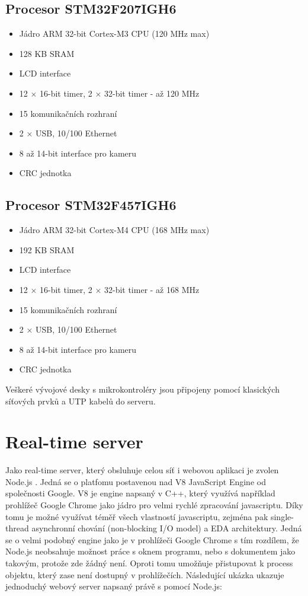 \subsection{Procesor STM32F207IGH6}
\begin{itemize}
\itemsep0em
\item Jádro ARM 32-bit Cortex\texttrademark-M3 CPU (120 MHz max)
\item 128 KB SRAM
\item LCD interface
\item 12 \ensuremath{\times} 16-bit timer, 2 \ensuremath{\times} 32-bit timer - až 120 MHz
\item 15 komunikačních rozhraní
\item 2 \ensuremath{\times} USB, 10/100 Ethernet
\item 8 až 14-bit interface pro kameru
\item CRC jednotka
\end{itemize}

\subsection{Procesor STM32F457IGH6}
\begin{itemize}
\itemsep0em
\item Jádro ARM 32-bit Cortex\texttrademark-M4 CPU (168 MHz max)
\item 192 KB SRAM
\item LCD interface
\item 12 \ensuremath{\times} 16-bit timer, 2 \ensuremath{\times} 32-bit timer - až 168 MHz
\item 15 komunikačních rozhraní
\item 2 \ensuremath{\times} USB, 10/100 Ethernet
\item 8 až 14-bit interface pro kameru
\item CRC jednotka
\end{itemize}

Veškeré vývojové desky s mikrokontroléry jsou připojeny pomocí klasických síťových prvků a UTP kabelů do serveru.

\section{Real-time server}
Jako real-time server, který obsluhuje celou síť i webovou aplikaci je zvolen Node.js \cite{nodejs}. Jedná se o platfomu postavenou nad V8 JavaScript Engine od společnosti Google. V8 je engine napsaný v C++, který využívá například prohlížeč Google Chrome jako jádro pro velmi rychlé zpracování javascriptu. Díky tomu je možné využívat téměř všech vlastností javascriptu, zejména pak single-thread asynchronní chování (non-blocking I/O model) a EDA architektury. Jedná se o velmi podobný engine jako je v prohlížeči Google Chrome s tím rozdílem, že Node.js neobsahuje možnost práce s oknem programu, nebo s dokumentem jako takovým, protože zde žádný není. Oproti tomu umožňuje přistupovat k process objektu, který zase není dostupný v prohlížečích. Následující ukázka ukazuje jednoduchý webový server napsaný právě s pomocí Node.js:

